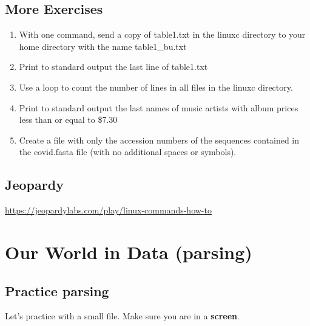 \documentclass[
]{book}
\begin{document}
\hypertarget{more-exercises}{%
\section{More Exercises}\label{more-exercises}}

\begin{enumerate}
\def\labelenumi{\arabic{enumi}.}
\item
  With one command, send a copy of table1.txt in the linuxc directory to your home directory with the name table1\_bu.txt
\item
  Print to standard output the last line of table1.txt
\item
  Use a loop to count the number of lines in all files in the linuxc directory.
\item
  Print to standard output the last names of music artists with album prices less than or equal to \$7.30
\item
  Create a file with only the accession numbers of the sequences contained in the covid.fasta file (with no additional spaces or symbols).
\end{enumerate}

\hypertarget{jeopardy}{%
\section{Jeopardy}\label{jeopardy}}

\url{https://jeopardylabs.com/play/linux-commands-how-to}

\hypertarget{our-world-in-data-parsing}{%
\chapter{Our World in Data (parsing)}\label{our-world-in-data-parsing}}

\hypertarget{practice-parsing}{%
\section{Practice parsing}\label{practice-parsing}}

Let's practice with a small file. Make sure you are in a \textbf{screen}.
\end{document}
